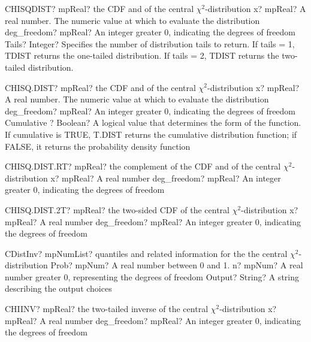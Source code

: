 \documentclass[12pt,a4paper,openany]{book}
\begin{document}
\begin{mpFunctionsExtract}
\mpWorksheetFunctionThreeNotImplemented
{CHISQDIST? mpReal? the CDF and of the central $\chi^2$-distribution}
{x? mpReal? A real number. The numeric value at which to evaluate the distribution}
{deg\_freedom? mpReal? An integer  greater 0, indicating the degrees of freedom}
{Tails? Integer? Specifies the number of distribution tails to return. If tails = 1, TDIST returns the one-tailed distribution. If tails = 2, TDIST returns the two-tailed distribution.}
\end{mpFunctionsExtract}

\begin{mpFunctionsExtract}
\mpWorksheetFunctionThreeNotImplemented
{CHISQ.DIST? mpReal? the CDF and of the central $\chi^2$-distribution}
{x? mpReal? A real number. The numeric value at which to evaluate the distribution}
{deg\_freedom? mpReal? An integer  greater 0, indicating the degrees of freedom}
{Cumulative ? Boolean? A logical value that determines the form of the function. If cumulative is TRUE, T.DIST returns the cumulative distribution function; if FALSE, it returns the probability density function}
\end{mpFunctionsExtract}

\begin{mpFunctionsExtract}
\mpWorksheetFunctionTwoNotImplemented
{CHISQ.DIST.RT? mpReal? the complement of the CDF and of the central $\chi^2$-distribution}
{x? mpReal? A real number}
{deg\_freedom? mpReal? An integer  greater 0, indicating the degrees of freedom}
\end{mpFunctionsExtract}

\begin{mpFunctionsExtract}
\mpWorksheetFunctionTwoNotImplemented
{CHISQ.DIST.2T? mpReal? the two-sided CDF of the central $\chi^2$-distribution}
{x? mpReal? A real number}
{deg\_freedom? mpReal? An integer  greater 0, indicating the degrees of freedom}
\end{mpFunctionsExtract}

\begin{mpFunctionsExtract}
\mpFunctionThreeNotImplemented
{CDistInv? mpNumList? quantiles and related information for the the central $\chi^2$-distribution}
{Prob? mpNum? A real number between 0 and 1.}
{n? mpNum? A real number greater 0, representing the degrees of freedom}
{Output? String? A string describing the output choices}
\end{mpFunctionsExtract}

\begin{mpFunctionsExtract}
\mpWorksheetFunctionTwoNotImplemented
{CHIINV? mpReal? the two-tailed inverse of the central $\chi^2$-distribution}
{x? mpReal? A real number}
{deg\_freedom? mpReal? An integer  greater 0, indicating the degrees of freedom}
\end{mpFunctionsExtract}
\end{document}
